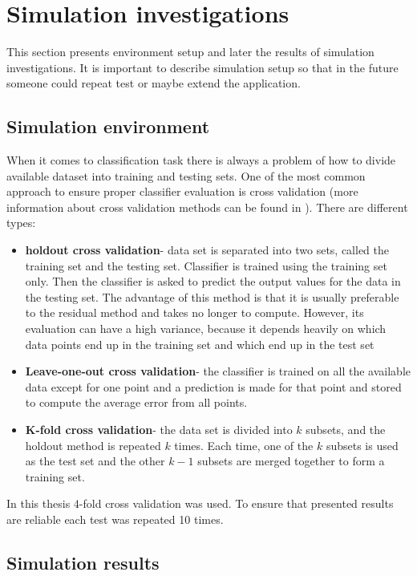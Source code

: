 \section{Simulation investigations}
This section presents environment setup and later the results of simulation
investigations. It is important to describe simulation setup so that in the
future someone could repeat test or maybe extend the application.
\label{cha:Simulation_investugations}
\subsection{Simulation environment}
When it comes to classification task there is always a problem of how to
divide available dataset into training and testing sets. One of the most common 
approach to ensure proper classifier evaluation is cross validation (more
information about cross validation methods can be found in \cite{bib41}). 
There are different types:
\begin{itemize}
    \item \textbf{holdout cross validation}- data set is separated into two sets, called the 
        training set and the testing set. Classifier is trained using the 
        training set only. Then the classifier is asked to predict the output 
        values for the data in the testing set. The advantage of this method is 
        that it is usually preferable to the residual method and takes no longer 
        to compute. However, its evaluation can have a high variance, because
        it depends heavily on which data points end up in the training set and 
        which end up in the test set
    \item \textbf{Leave-one-out cross validation}- the classifier is trained on all the
        available data except for one point and a prediction is made for that
        point and stored to compute the average error from all points. 
    \item \textbf{K-fold cross validation}- the data set is divided into $k$ subsets, 
        and the holdout method is repeated $k$ times. Each time, one of the $k$ subsets 
        is used as the test set and the other $k-1$ subsets are merged together to form 
        a training set.
\end{itemize}
In this thesis $4$-fold cross validation was used. To ensure that presented
results are reliable each test was repeated 10 times.
\label{cha:Simulation_environment}
\subsection{Simulation results}
\label{cha:Simulation_results}

